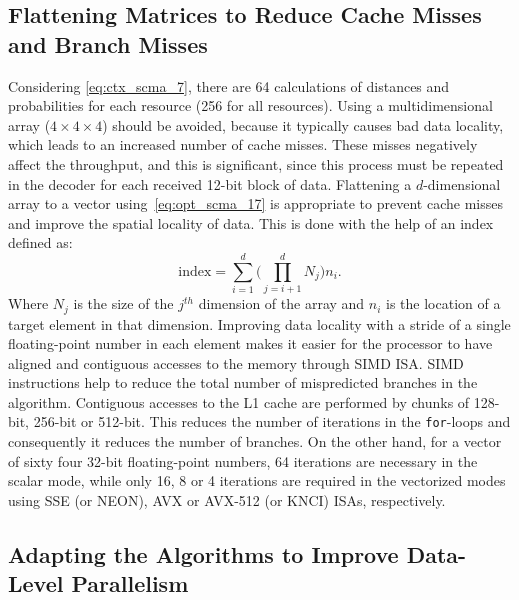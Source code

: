\subsection{Flattening Matrices to Reduce Cache Misses and Branch Misses}
\label{sec:opt_scma_flattening}

Considering \eqref{eq:ctx_scma_7}, there are 64 calculations of distances and
probabilities for each resource (256 for all resources). Using a
multidimensional array ($4\times4\times4$) should be avoided, because it
typically causes bad data locality, which leads to an increased number of cache
misses. These misses negatively affect the throughput, and this is significant,
since this process must be repeated in the decoder for each received 12-bit
block of data. Flattening a $d$-dimensional array to a vector
using~\eqref{eq:opt_scma_17} is appropriate to prevent cache misses and improve
the spatial locality of data. This is done with the help of an index defined as:
\begin{equation}
  \label{eq:opt_scma_17}
  \text{index} = \sum\limits_{i=1}^d\Bigg( \prod\limits_{j=i+1}^d N_j \Bigg)n_i.
\end{equation}
Where $N_j$ is the size of the $j^{th}$ dimension of the array and $n_i$ is the
location of a target element in that dimension. Improving data locality with
a stride of a single floating-point number in each element makes it easier for
the processor to have aligned and contiguous accesses to the memory through SIMD
ISA. SIMD instructions help to reduce the total number of mispredicted branches
in the algorithm. Contiguous accesses to the L1 cache are performed by chunks of
128-bit, 256-bit or 512-bit. This reduces the number of iterations in the
\verb|for|-loops and consequently it reduces the number of branches. On the
other hand, for a vector of sixty four 32-bit floating-point numbers, 64
iterations are necessary in the scalar mode, while only 16, 8 or 4 iterations
are required in the vectorized modes using SSE (or NEON), AVX or
AVX-512 (or KNCI) ISAs, respectively.

\subsection{Adapting the Algorithms to Improve Data-Level Parallelism}
\label{sec:opt_scma_adapting_algorithms}

